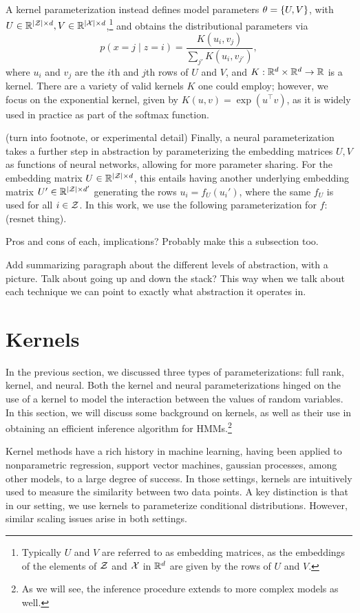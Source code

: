 \documentclass{article}
\begin{document}
A kernel parameterization instead defines model parameters $\theta = \left\{U,V\right\}$,
with $U\in\mathbb{R}^{|\mathcal{Z}|\times d},V\in\mathbb{R}^{|\mathcal{X}|\times d}$,\footnote{
Typically $U$ and $V$ are referred to as embedding matrices,
as the embeddings of the elements of $\mathcal{Z}$ and $\mathcal{X}$ in $\mathbb{R}^d$ are given by 
the rows of $U$ and $V$.
} and obtains the distributional
parameters via
$$p(x=j \mid z=i) = \frac{K(u_i, v_j)}{\sum_{j'} K(u_i, v_{j'})},$$
where $u_i$ and $v_j$ are the $i$th and $j$th rows of $U$ and $V$,
and $K: \mathbb{R}^d \times \mathbb{R}^d \to \mathbb{R}$ is a kernel.
There are a variety of valid kernels $K$ one could employ;
however, we focus on the exponential kernel, given by $K(u, v) = \exp(u^\top v)$,
as it is widely used in practice as part of the softmax function.

(turn into footnote, or experimental detail)
Finally, a neural parameterization takes a further step in abstraction by
parameterizing the embedding matrices $U,V$ as functions of neural networks,
allowing for more parameter sharing.
For the embedding matrix $U\in\mathbb{R}^{|\mathcal{Z}|\times d}$,
this entails having another underlying embedding matrix $U'\in\mathbb{R}^{|\mathcal{Z}| \times d'}$
generating the rows $u_i = f_U(u_i')$, where the same $f_U$ is used for all $i \in \mathcal{Z}$.
In this work, we use the following parameterization for $f$:
(resnet thing).

Pros and cons of each, implications?
Probably make this a subsection too.

Add summarizing paragraph about the different levels of abstraction, with a picture.
Talk about going up and down the stack?
This way when we talk about each technique we can point
to exactly what abstraction it operates in.

\section{Kernels}
In the previous section, we discussed three types of parameterizations: full rank,
kernel, and neural. Both the kernel and neural parameterizations hinged on the use of
a kernel to model the interaction between the values of random variables.
In this section, we will discuss some background on kernels, as well as
their use in obtaining an efficient inference algorithm for HMMs.\footnote{
As we will see, the inference procedure extends to more complex models as well.
}

Kernel methods have a rich history in machine learning,
having been applied to nonparametric regression, support vector machines, gaussian processes,
among other models, to a large degree of success.
In those settings, kernels are intuitively used to measure the similarity between two data points.
A key distinction is that in our setting,
we use kernels to parameterize conditional distributions.
However, similar scaling issues arise in both settings.
\end{document}
